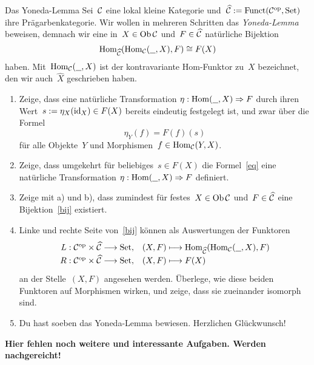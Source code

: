 \documentclass{pizzablatt}
\begin{document}

\begin{aufgabe}{Das Yoneda-Lemma}
Sei~$\mathcal{C}$ eine lokal kleine Kategorie und~$\widehat {\mathcal{C}} := \mathrm{Funct}(\mathcal{C}^{\mathrm{op}},\mathrm{Set})$
ihre Prägarbenkategorie. Wir wollen in mehreren Schritten das \emph{Yoneda-Lemma}
beweisen, demnach wir eine in~$X \in \operatorname{Ob} \mathcal{C}$ und~$F \in \widehat {\mathcal{C}}$
natürliche Bijektion
\begin{equation}\label{bij}\mathrm{Hom}_{\widehat{\mathcal{C}}}(\mathrm{Hom}_{\mathcal{C}}(\underline{\ \ }, X), F) \cong F(X)
\end{equation}
haben. Mit~$\mathrm{Hom}_{\mathcal{C}}(\underline{\ \ },X)$ ist der kontravariante Hom-Funktor zu~$X$
bezeichnet, den wir auch~$\widehat X$ geschrieben haben.
\begin{enumerate}
\item Zeige, dass eine natürliche Transformation $\eta : \mathrm{Hom}(\underline{\ \ }, X)
\Rightarrow F$ durch ihren Wert~$s := \eta_X(\mathrm{id}_X) \in F(X)$ bereits eindeutig
festgelegt ist, und zwar über die Formel
\begin{equation}\label{eq} \eta_Y(f) = F(f)(s) \end{equation}
für alle Objekte~$Y$ und Morphismen~$f \in \mathrm{Hom}_{\mathcal{C}}(Y,X)$.
\item Zeige, dass umgekehrt für beliebiges~$s \in F(X)$ die Formel~\eqref{eq} eine
natürliche Transformation $\eta : \mathrm{Hom}(\underline{\ \ }, X) \Rightarrow F$ definiert.
\item Zeige mit a) und b), dass zumindest für festes~$X \in \operatorname{Ob}\mathcal{C}$ und~$F \in
\widehat{\mathcal{C}}$ eine Bijektion~\eqref{bij} existiert.
\item Linke und rechte Seite von~\eqref{bij} können als Auswertungen der
Funktoren
\[ \renewcommand{\arraystretch}{1.3}\begin{array}{@{}rl@{}}
  L : \C^\op \times \widehat\C \longrightarrow \Set, &
  (X,F) \longmapsto \Hom_{\widehat\C}(\Hom_\C(\freist,X), F)
  \\
  R : \C^\op \times \widehat\C \longrightarrow \Set, &
  (X,F) \longmapsto F(X)
\end{array} \]
an der Stelle~$(X,F)$ angesehen werden. Überlege, wie diese beiden Funktoren auf
Morphismen wirken, und zeige, dass sie zueinander isomorph sind.
\item Du hast soeben das Yoneda-Lemma bewiesen. Herzlichen Glückwunsch!
\end{enumerate}
\end{aufgabe}

\textbf{Hier fehlen noch weitere und interessante Aufgaben. Werden
nachgereicht!}
\end{document}
